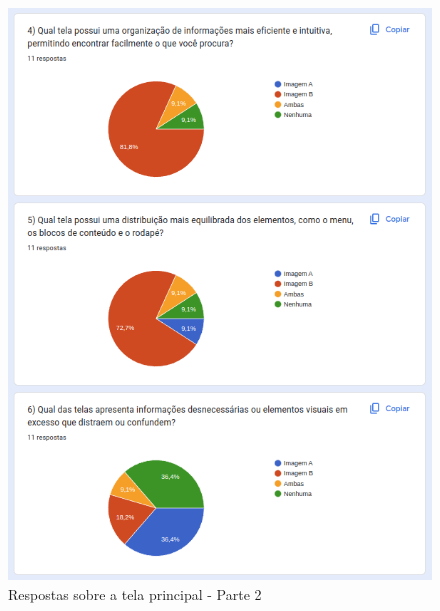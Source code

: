 \begin{figure}[!h]
	\begin{center}
	    \includegraphics[scale=0.7]{figs/Answers/Professionals/13.png}
	\end{center}
	\caption{\label{APC_TP02}Respostas sobre a tela principal - Parte 2}
\end{figure}

\newpage

